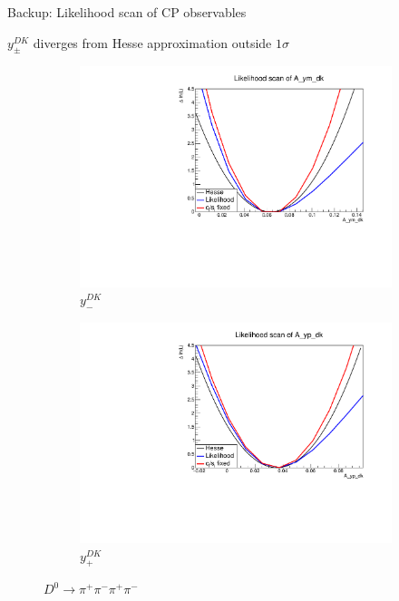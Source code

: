 \documentclass[xcolor={dvipsnames}]{beamer}
\begin{document}
\begin{frame}{Backup: Likelihood scan of CP observables}
  \begin{center}
    $y_\pm^{DK}$ diverges from Hesse approximation outside $1\sigma$
  \end{center}
  \begin{figure}
    \centering
    \begin{subfigure}{0.5\textwidth}
      \centering
      \includegraphics[width=1.0\textwidth]{Plots/A_ym_dk_likelihood_scan_pipipipi.pdf}
      \vspace{-0.3cm}
      \caption*{$y_-^{DK}$}
    \end{subfigure}%
    \begin{subfigure}{0.5\textwidth}
      \centering
      \includegraphics[width=1.0\textwidth]{Plots/A_yp_dk_likelihood_scan_pipipipi.pdf}
      \vspace{-0.3cm}
      \caption*{$y_+^{DK}$}
    \end{subfigure}
    \caption*{$D^0\to\pi^+\pi^-\pi^+\pi^-$}
  \end{figure}
\end{frame}
\end{document}
